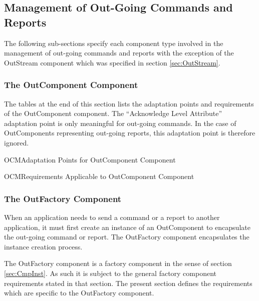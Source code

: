 \documentclass[a4paper,10pt]{article}
\newenvironment{cr_req}[2]
{%
\begin{longtable}{|l|p{9.8cm}|}
\caption{#2} \\
\hline
\rowcolor{light-gray}
\textbf{Req. ID} & \textbf{Requirement Text}\\
\hline\hline
\endfirsthead
\rowcolor{light-gray}
\textbf{Req. ID} & \textbf{Requirement Text}\\
\hline\hline
\endhead
\DTLforeach*[\DTLiseq{\cat}{#1}]{dbReq}{\cat=Category,\type=Type,\id=Id,\reqText=Text}
{\DTLiffirstrow{}{\\\hline}\cat-\id/\type & \textit{\reqText}}\\\hline
}
{\end{longtable}}
\newenvironment{cr_ap}[2]
{%
\begin{longtable}{|l|p{4.7cm}|p{4.9cm}|}
\caption{#2} \\
\hline
\rowcolor{light-gray}
\textbf{AP ID} & \textbf{Adaptation Point} & \textbf{Default Value}\\
\hline\hline
\endfirsthead
\rowcolor{light-gray}
\textbf{AP ID} & \textbf{Adaptation Point} & \textbf{Default Value}\\
\hline\hline
\endhead
\DTLforeach*[\DTLiseq{\cat}{#1}]{dbAP}{\cat=Category,\id=Id,\ap=AP,\defValue=DefValue}
{\DTLiffirstrow{}{\\\hline}\cat-\id & \ap & \defValue}\\\hline
}
{\end{longtable}}
\begin{document}
\subsection{Management of Out-Going Commands and Reports}\label{sec:ManagementOfOutGoingCmdAndRep}
 

The following sub-sections specify each component type involved in the management of out-going commands and reports with the exception of the OutStream component which was specified in section \ref{sec:OutStream}. 

\subsubsection{The OutComponent Component}\label{sec:OutComponent}
 

The tables at the end of this section lists the adaptation points and requirements of the OutComponent component. The “Acknowledge Level Attribute” adaptation point is only meaningful for out-going commands. In the case of OutComponents representing out-going reports, this adaptation point is therefore ignored.

\begin{cr_ap}{OCM}{Adaptation Points for OutComponent Component}
\end{cr_ap}

\begin{cr_req}{OCM}{Requirements Applicable to OutComponent Component}
\end{cr_req}

\subsubsection{The OutFactory Component}\label{sec:OutFactory}

When an application needs to send a command or a report to another application, it must first create an instance of an OutComponent to encapsulate the out-going command or report. The OutFactory component encapsulates the instance creation process.

The OutFactory component is a factory component in the sense of section \ref{sec:CmpInst}. As such it is subject to the general factory component requirements stated in that section. The present section defines the requirements which are specific to the OutFactory component.
\end{document}
